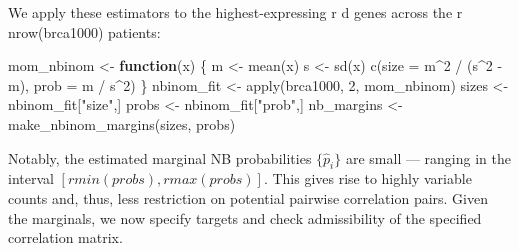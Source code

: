 \documentclass{article}
\newenvironment{Shaded}{\begin{snugshade}}{\end{snugshade}}
\newcommand{\AttributeTok}[1]{\textcolor[rgb]{0.77,0.63,0.00}{#1}}
\newcommand{\ControlFlowTok}[1]{\textcolor[rgb]{0.13,0.29,0.53}{\textbf{#1}}}
\newcommand{\DecValTok}[1]{\textcolor[rgb]{0.00,0.00,0.81}{#1}}
\newcommand{\FunctionTok}[1]{\textcolor[rgb]{0.00,0.00,0.00}{#1}}
\newcommand{\NormalTok}[1]{#1}
\newcommand{\OtherTok}[1]{\textcolor[rgb]{0.56,0.35,0.01}{#1}}
\newcommand{\SpecialCharTok}[1]{\textcolor[rgb]{0.00,0.00,0.00}{#1}}
\newcommand{\StringTok}[1]{\textcolor[rgb]{0.31,0.60,0.02}{#1}}
\begin{document}
\begin{Shaded}
\end{Shaded}

We apply these estimators to the highest-expressing r d genes across the
r nrow(brca1000) patients:

\begin{Shaded}
\begin{Highlighting}[]
\NormalTok{mom\_nbinom }\OtherTok{\textless{}{-}} \ControlFlowTok{function}\NormalTok{(x) \{}
\NormalTok{  m }\OtherTok{\textless{}{-}} \FunctionTok{mean}\NormalTok{(x)}
\NormalTok{  s }\OtherTok{\textless{}{-}} \FunctionTok{sd}\NormalTok{(x)}
  \FunctionTok{c}\NormalTok{(}\AttributeTok{size =}\NormalTok{ m}\SpecialCharTok{\^{}}\DecValTok{2} \SpecialCharTok{/}\NormalTok{ (s}\SpecialCharTok{\^{}}\DecValTok{2} \SpecialCharTok{{-}}\NormalTok{ m), }\AttributeTok{prob =}\NormalTok{ m }\SpecialCharTok{/}\NormalTok{ s}\SpecialCharTok{\^{}}\DecValTok{2}\NormalTok{)}
\NormalTok{\}}
\NormalTok{nbinom\_fit }\OtherTok{\textless{}{-}} \FunctionTok{apply}\NormalTok{(brca1000, }\DecValTok{2}\NormalTok{, mom\_nbinom)}
\NormalTok{sizes }\OtherTok{\textless{}{-}}\NormalTok{ nbinom\_fit[}\StringTok{"size"}\NormalTok{,]}
\NormalTok{probs }\OtherTok{\textless{}{-}}\NormalTok{ nbinom\_fit[}\StringTok{"prob"}\NormalTok{,]}
\NormalTok{nb\_margins }\OtherTok{\textless{}{-}} \FunctionTok{make\_nbinom\_margins}\NormalTok{(sizes, probs)}
\end{Highlighting}
\end{Shaded}

Notably, the estimated marginal NB probabilities \(\{ \hat{p}_i \}\) are
small --- ranging in the interval \([r min(probs) , r max(probs)]\).
This gives rise to highly variable counts and, thus, less restriction on
potential pairwise correlation pairs. Given the marginals, we now
specify targets and check admissibility of the specified correlation
matrix.
\end{document}
